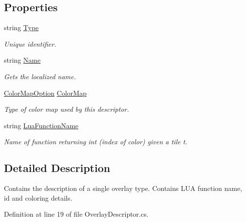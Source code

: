 \subsection*{Properties}
\begin{DoxyCompactItemize}
\item 
string \hyperlink{class_overlay_descriptor_a5d9bc37e7dbea883b6e3f2905641a34a}{Type}
\begin{DoxyCompactList}\small\item\em Unique identifier. \end{DoxyCompactList}\item 
string \hyperlink{class_overlay_descriptor_aa49f263dd8fbf9ed36f031f2bacc5815}{Name}
\begin{DoxyCompactList}\small\item\em Gets the localized name. \end{DoxyCompactList}\item 
\hyperlink{class_overlay_descriptor_ace98995d8c49c9395934100f3e5e1240}{Color\+Map\+Option} \hyperlink{class_overlay_descriptor_ad6059c6ff98838034b392330e33b8217}{Color\+Map}
\begin{DoxyCompactList}\small\item\em Type of color map used by this descriptor. \end{DoxyCompactList}\item 
string \hyperlink{class_overlay_descriptor_a926c5e857cd945f6a2f560d71c79a927}{Lua\+Function\+Name}
\begin{DoxyCompactList}\small\item\em Name of function returning int (index of color) given a tile t. \end{DoxyCompactList}\end{DoxyCompactItemize}


\subsection{Detailed Description}
Contains the description of a single overlay type. Contains L\+UA function name, id and coloring details. 



Definition at line 19 of file Overlay\+Descriptor.\+cs.



